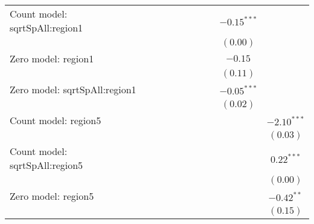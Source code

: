 \begin{table}
\begin{center}
{\begin{tabular}{l c c c c c c c c c}
Count model: sqrtSpAll:region1 &               &               &               &                 &               &                 &                 & $-0.15^{***}$ &               \\
                               &               &               &               &                 &               &                 &                 & $(0.00)$      &               \\
Zero model: region1            &               &               &               &                 &               &                 &                 & $-0.15$       &               \\
                               &               &               &               &                 &               &                 &                 & $(0.11)$      &               \\
Zero model: sqrtSpAll:region1  &               &               &               &                 &               &                 &                 & $-0.05^{***}$ &               \\
                               &               &               &               &                 &               &                 &                 & $(0.02)$      &               \\
Count model: region5           &               &               &               &                 &               &                 &                 &               & $-2.10^{***}$ \\
                               &               &               &               &                 &               &                 &                 &               & $(0.03)$      \\
Count model: sqrtSpAll:region5 &               &               &               &                 &               &                 &                 &               & $0.22^{***}$  \\
                               &               &               &               &                 &               &                 &                 &               & $(0.00)$      \\
Zero model: region5            &               &               &               &                 &               &                 &                 &               & $-0.42^{**}$  \\
                               &               &               &               &                 &               &                 &                 &               & $(0.15)$      \\

\end{tabular}}
\end{center}
\end{table}
